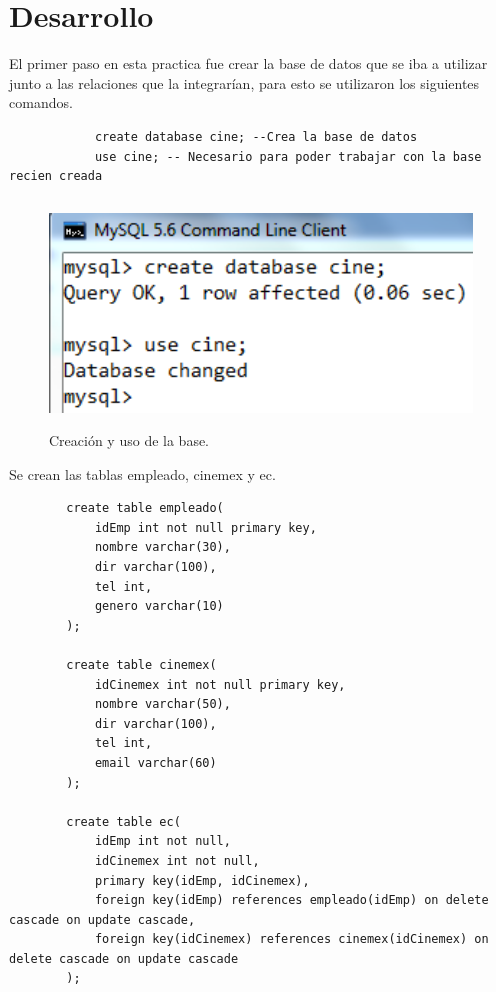 \documentclass[12pt, titlepage]{article}
\begin{document}
    \section{Desarrollo}
        El primer paso en esta practica fue crear la base de datos que se iba a utilizar junto a las relaciones que la integrarían, para esto se utilizaron los siguientes comandos.
        \begin{lstlisting}
            create database cine; --Crea la base de datos
            use cine; -- Necesario para poder trabajar con la base recien creada
        \end{lstlisting}
        \begin{figure}[H]
            \begin{center}
                \includegraphics[width=12cm, height=6cm]{img/hasta-use.png}
                \caption{Creación y uso de la base.}
                \label{fig:hasta-use}
            \end{center}
        \end{figure}
    Se crean las tablas empleado, cinemex y ec.
        \begin{lstlisting}
        create table empleado(
            idEmp int not null primary key,
            nombre varchar(30),
            dir varchar(100),
            tel int,
            genero varchar(10)
        );
        
        create table cinemex(
            idCinemex int not null primary key,
            nombre varchar(50),
            dir varchar(100),
            tel int,
            email varchar(60)
        );
        
        create table ec(
            idEmp int not null,
            idCinemex int not null,
            primary key(idEmp, idCinemex),
            foreign key(idEmp) references empleado(idEmp) on delete cascade on update cascade,
            foreign key(idCinemex) references cinemex(idCinemex) on delete cascade on update cascade
        );
        \end{lstlisting}
\end{document}

